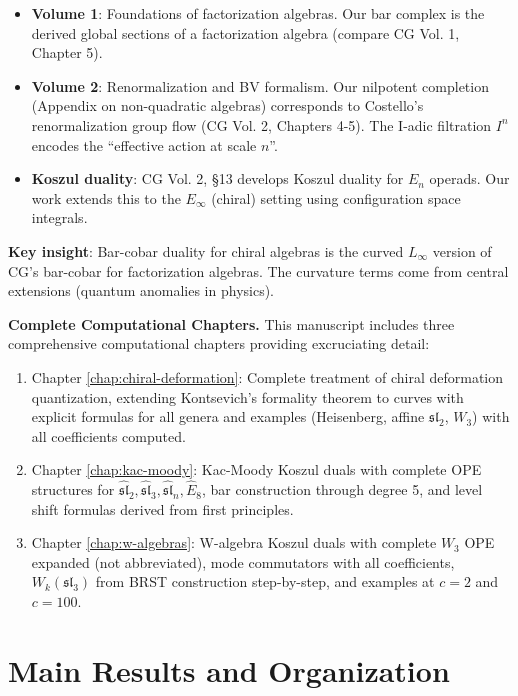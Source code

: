\begin{itemize}
\item \textbf{Volume 1}: Foundations of factorization algebras. Our bar complex is 
the derived global sections of a factorization algebra (compare CG Vol. 1, Chapter 5).

\item \textbf{Volume 2}: Renormalization and BV formalism. Our nilpotent completion 
(Appendix on non-quadratic algebras) corresponds to Costello's renormalization 
group flow (CG Vol. 2, Chapters 4-5). The I-adic filtration $I^n$ encodes the 
``effective action at scale $n$''.

\item \textbf{Koszul duality}: CG Vol. 2, \S13 develops Koszul duality for $E_n$ 
operads. Our work extends this to the $E_\infty$ (chiral) setting using configuration 
space integrals.
\end{itemize}

\textbf{Key insight}: Bar-cobar duality for chiral algebras is the curved $L_\infty$ 
version of CG's bar-cobar for factorization algebras. The curvature terms come from 
central extensions (quantum anomalies in physics).

\medskip
\noindent
\textbf{Complete Computational Chapters.} This manuscript includes three comprehensive computational chapters providing excruciating detail:
\begin{enumerate}
\item Chapter \ref{chap:chiral-deformation}: Complete treatment of chiral deformation quantization, extending Kontsevich's formality theorem to curves with explicit formulas for all genera and examples (Heisenberg, affine $\mathfrak{sl}_2$, $W_3$) with all coefficients computed.
\item Chapter \ref{chap:kac-moody}: Kac-Moody Koszul duals with complete OPE structures for $\widehat{\mathfrak{sl}}_2, \widehat{\mathfrak{sl}}_3, \widehat{\mathfrak{sl}}_n, \widehat{E}_8$, bar construction through degree 5, and level shift formulas derived from first principles.
\item Chapter \ref{chap:w-algebras}: W-algebra Koszul duals with complete $W_3$ OPE expanded (not abbreviated), mode commutators with all coefficients, $W_k(\mathfrak{sl}_3)$ from BRST construction step-by-step, and examples at $c=2$ and $c=100$.
\end{enumerate}

\section{Main Results and Organization}

